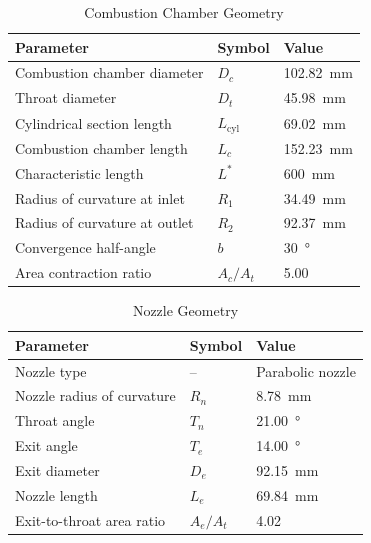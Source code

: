 \begin{table}[H]
    \centering
    \begin{tabular}{|l|l|l|}
        \hline
        \textbf{Parameter} & \textbf{Symbol} & \textbf{Value} \\ \hline
        Combustion chamber diameter & \(D_c\) & \SI{102.82}{\milli\meter} \\ \hline
        Throat diameter & \(D_t\) & \SI{45.98}{\milli\meter} \\ \hline
        Cylindrical section length & \(L_{\text{cyl}}\) & \SI{69.02}{\milli\meter} \\ \hline
        Combustion chamber length & \(L_c\) & \SI{152.23}{\milli\meter} \\ \hline
        Characteristic length & \(L^*\) & \SI{600}{\milli\meter} \\ \hline
        Radius of curvature at inlet & \(R_1\) & \SI{34.49}{\milli\meter} \\ \hline
        Radius of curvature at outlet & \(R_2\) & \SI{92.37}{\milli\meter} \\ \hline
        Convergence half-angle & \(b\) & \SI{30}{\degree} \\ \hline
        Area contraction ratio & \(A_c/A_t\) & 5.00 \\ \hline
    \end{tabular}
    \caption{Combustion Chamber Geometry}
\end{table}

\begin{table}[H]
    \centering
    \begin{tabular}{|l|l|l|}
        \hline
        \textbf{Parameter} & \textbf{Symbol} & \textbf{Value} \\ \hline
        Nozzle type & -- & Parabolic nozzle \\ \hline
        Nozzle radius of curvature & \(R_n\) & \SI{8.78}{\milli\meter} \\ \hline
        Throat angle & \(T_n\) & \SI{21.00}{\degree} \\ \hline
        Exit angle & \(T_e\) & \SI{14.00}{\degree} \\ \hline
        Exit diameter & \(D_e\) & \SI{92.15}{\milli\meter} \\ \hline
        Nozzle length & \(L_e\) & \SI{69.84}{\milli\meter} \\ \hline
        Exit-to-throat area ratio & \(A_e/A_t\) & 4.02 \\ \hline
    \end{tabular}
    \caption{Nozzle Geometry}
\end{table}

